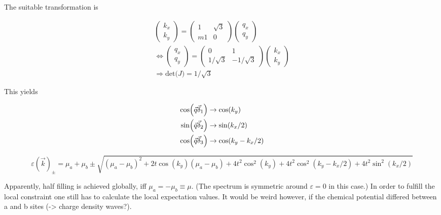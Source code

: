 \documentclass[../../../main.tex]{subfiles}
\begin{document}
The suitable transformation is 

\begin{gather}
	\begin{pmatrix}
		k_x \\
		k_y 
	\end{pmatrix}=
	\begin{pmatrix}
		1 & \sqrt{3} \\
	m	1 & 0
	\end{pmatrix}
	\begin{pmatrix}
		q_x \\
		q_y
	\end{pmatrix} \\
	\Leftrightarrow
	\begin{pmatrix}
		q_x \\
		q_y 
	\end{pmatrix}=
	\begin{pmatrix}
		0  & 1\\
		1/\sqrt{3} & -1/\sqrt{3}
	\end{pmatrix}
	\begin{pmatrix}
		k_x \\
		k_y 
	\end{pmatrix} \\
	\Rightarrow \text{det($J$)} = 1/\sqrt{3}
\end{gather}

This yields 

\begin{align}
	\cos(\vec{q}\vec{\delta}_1)  &\rightarrow \cos(k_y) \notag\\
	\sin(\vec{q}\vec{\delta}_2) &\rightarrow\sin(k_x/2) \\
	\cos(\vec{q}\vec{\delta}_3) &\rightarrow \cos(k_y-k_x/2)
\end{align}

\begin{equation}
	\varepsilon(\vec{k})_{\pm} = \mu_a + \mu_b \pm \sqrt{\left(\mu_a-\mu_b\right)^2 + 2t\cos(k_y)(\mu_a-\mu_b) + 4t^2\cos^2(k_y) + 4t^2\cos^2\left(k_y - k_x/2\right) + 4t^2\sin^2\left(k_x/2\right)}
\end{equation}

Apparently, half filling is achieved globally, iff $\mu_a = -\mu_b \equiv \mu$. (The spectrum is symmetric around $\varepsilon = 0$ in this case.) In order to fulfill the local constraint one still has to calculate the local expectation values. It would be weird however, if the chemical potential differed between a and b sites (-> charge density waves?).
\end{document}
